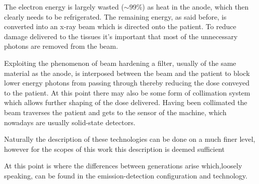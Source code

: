The electron energy is largely wasted ($\sim 99\%$) as heat in the anode, which then clearly needs to be refrigerated. The remaining energy, as said before, is converted into an x-ray beam which is directed onto the patient. To reduce damage delivered to the tissues it's important that most of the unnecessary photons are removed from the beam.

Exploiting the phenomenon of beam hardening a filter, usually of the same material as the anode, is interposed between the beam and the patient to block lower energy photons from passing through thereby reducing the dose conveyed to the patient. At this point there may also be some form of collimation system which allows further shaping of the dose delivered. Having been collimated the beam traverses the patient and gets to the sensor of the machine, which nowadays are usually solid-state detectors.

Naturally the description of these technologies can be done on a much finer level, however for the scopes of this work this description is deemed sufficient 

At this point is where the differences between generations arise which,loosely speaking, can be found in the emission-detection configuration and technology.


